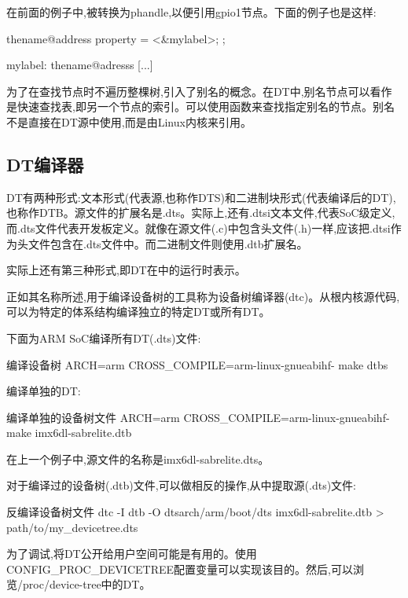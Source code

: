 \documentclass[lang=cn,newtx,10pt,scheme=chinese]{elegantbook}
\begin{document}
在前面的例子中,被转换为phandle,以便引用gpio1节点。下面的例子也是这样:

\begin{mycode}
thename@address {
    property = <&mylabel>;
};

mylabel: thename@adresss {
    [...]
}
\end{mycode}

为了在查找节点时不遍历整棵树,引入了别名的概念。在DT中,别名节点可以看作是快速查找表,即另一个节点的索引。可以使用函数来查找指定别名的节点。别名不是直接在DT源中使用,而是由Linux内核来引用。

\subsection{DT编译器}

DT有两种形式:文本形式(代表源,也称作DTS)和二进制块形式(代表编译后的DT),也称作DTB。源文件的扩展名是.dts。实际上,还有.dtsi文本文件,代表SoC级定义,而.dts文件代表开发板定义。就像在源文件(.c)中包含头文件(.h)一样,应该把.dtsi作为头文件包含在.dts文件中。而二进制文件则使用.dtb扩展名。

实际上还有第三种形式,即DT在中的运行时表示。

正如其名称所述,用于编译设备树的工具称为设备树编译器(dtc)。从根内核源代码,可以为特定的体系结构编译独立的特定DT或所有DT。

下面为ARM SoC编译所有DT(.dts)文件:

\begin{mycode}{编译设备树}
ARCH=arm CROSS_COMPILE=arm-linux-gnueabihf- make dtbs
\end{mycode}

编译单独的DT:

\begin{mycode}{编译单独的设备树文件}
ARCH=arm CROSS_COMPILE=arm-linux-gnueabihf- make imx6dl-sabrelite.dtb
\end{mycode}

在上一个例子中,源文件的名称是imx6dl-sabrelite.dts。

对于编译过的设备树(.dtb)文件,可以做相反的操作,从中提取源(.dts)文件:

\begin{mycode}{反编译设备树文件}
dtc -I dtb -O dtsarch/arm/boot/dts imx6dl-sabrelite.dtb > path/to/my_devicetree.dts
\end{mycode}

\begin{marker}
为了调试,将DT公开给用户空间可能是有用的。使用CONFIG\_PROC\_DEVICETREE配置变量可以实现该目的。然后,可以浏览/proc/device-tree中的DT。
\end{marker}
\end{document}
